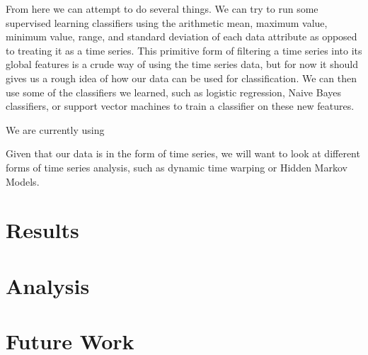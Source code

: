 \documentclass{amsart}
\begin{document}
From here we can attempt to do several things. We can try to run some supervised learning classifiers using the arithmetic mean, maximum value, minimum value, range, and standard deviation of each data attribute as opposed to treating it as a time series. 
This primitive form of filtering a time series into its global features is a crude way of using the time series data, but for now it should gives us a rough idea of how our data can be used for classification. We can then use some of the classifiers we learned, such as logistic regression, Naive Bayes classifiers, or support vector machines to train a classifier on these new features. 

We are currently using 

Given that our data is in the form of time series, we will want to look at different forms of time series analysis, such as dynamic time warping or Hidden Markov Models. 

\section{Results}

\section{Analysis}

\section{Future Work}

\end{document}
